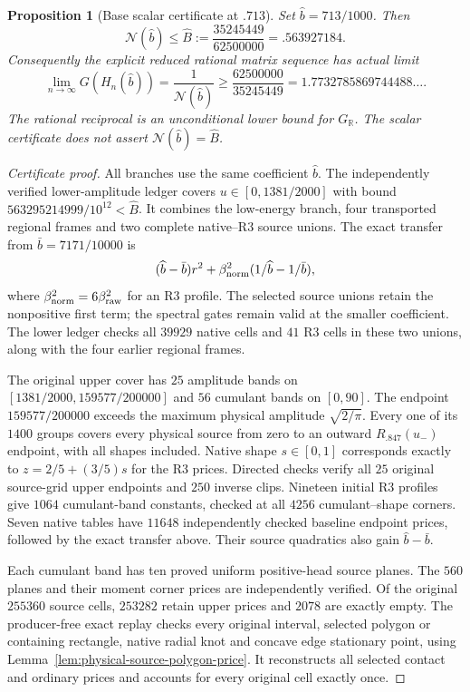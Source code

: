 \documentclass[11pt]{article}
\newcommand{\N}{\mathcal N}
\newtheorem{proposition}[theorem]{Proposition}
\begin{document}
\begin{proposition}[Base scalar certificate at $.713$]
\label{prop:base-final29-713}
Set $\widehat b=713/1000$. Then
\[
 \N(\widehat b)\le\widehat B:=\frac{35245449}{62500000}
 =.563927184.
\]
Consequently the explicit reduced rational matrix sequence has actual limit
\[
 \lim_{n\to\infty}G(H_n(\widehat b))
 =\frac1{\N(\widehat b)}
 \ge\frac{62500000}{35245449}
 =1.7732785869744488\ldots .
\]
The rational reciprocal is an unconditional lower bound for
$G_{\mathbb R}$. The scalar certificate does not assert
$\N(\widehat b)=\widehat B$.
\end{proposition}
\begin{proof}[Certificate proof]
All branches use the same coefficient $\widehat b$. The independently
verified lower-amplitude ledger covers $u\in[0,1381/2000]$ with bound
$563295214999/10^{12}<\widehat B$. It combines the low-energy branch,
four transported regional frames and two complete native--R3 source
unions. The exact transfer from $\bar b=7171/10000$ is
\[
 (\widehat b-\bar b)r^2+
 \beta_{\rm norm}^2(1/\widehat b-1/\bar b),
\]
where $\beta_{\rm norm}^2=6\beta_{\rm raw}^2$ for an R3 profile.
The selected source unions retain the nonpositive first term; the
spectral gates remain valid at the smaller coefficient. The lower
ledger checks all $39929$ native cells and $41$ R3 cells in these two
unions, along with the four earlier regional frames.

The original upper cover has $25$ amplitude bands on
$[1381/2000,159577/200000]$ and $56$ cumulant bands on $[0,90]$.
The endpoint $159577/200000$ exceeds the maximum physical amplitude
$\sqrt{2/\pi}$. Every one of its $1400$ groups covers every physical
source from zero to an outward $R_{.847}(u_-)$ endpoint, with all shapes
included. Native shape $s\in[0,1]$ corresponds exactly to
$z=2/5+(3/5)s$ for the R3 prices. Directed checks verify all $25$
original source-grid upper endpoints and $250$ inverse clips.
Nineteen initial R3 profiles give $1064$ cumulant-band constants,
checked at all $4256$ cumulant--shape corners. Seven native tables
have $11648$ independently checked baseline endpoint prices, followed
by the exact transfer above. Their source quadratics also gain
$\widehat b-\bar b$.

Each cumulant band has ten proved uniform positive-head source planes.
The $560$ planes and their moment corner prices are independently
verified. Of the original $255360$ source cells, $253282$ retain
upper prices and $2078$ are exactly empty. The producer-free exact
replay checks every original interval, selected polygon or containing
rectangle, native radial knot and concave edge stationary point, using
Lemma~\ref{lem:physical-source-polygon-price}. It reconstructs all
selected contact and ordinary prices and accounts for every original
cell exactly once.


\end{proof}
\end{document}
